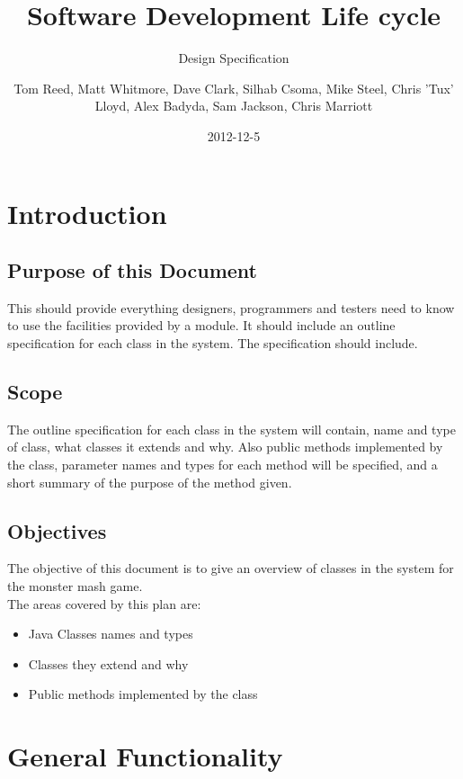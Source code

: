 \documentclass{project}
\begin{document}
\title{Software Development Life cycle}
\subtitle{Design Specification}
\author{Tom Reed, Matt Whitmore, Dave Clark, Silhab Csoma, Mike Steel, Chris 'Tux' Lloyd, Alex Badyda, Sam Jackson, Chris Marriott}
\date{2012-12-5}
\maketitle
\tableofcontents
\newpage
\section{Introduction}
\subsection{Purpose of this Document}
This should provide everything designers, programmers and testers need to know to use the facilities
provided by a module. It should include an outline specification for each class in the system. The specification
should include.

\subsection{Scope}
The outline specification for each class in the system will contain, name and type of class, what classes it extends and why. Also public methods implemented by the class, parameter names and types for each method will be specified, and a short summary of the purpose of the method given.

\subsection{Objectives}
The objective of this document is to give an overview of classes in the system for the monster mash game.
\\
The areas covered by this plan are:
\begin{itemize}
	\item Java Classes names and types
	\item Classes they extend and why
	\item Public methods implemented by the class
\end{itemize}

\section{General Functionality}
\end{document}

